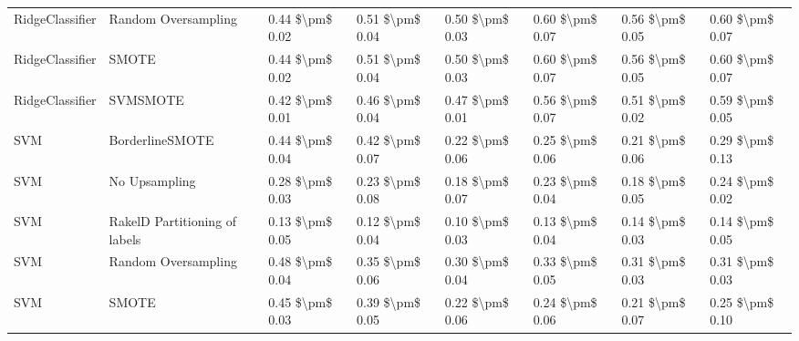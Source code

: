 \begin{tabular}{llllllll}
                RidgeClassifier &           Random Oversampling & 0.44 \$\textbackslash pm\$ 0.02 &           0.51 \$\textbackslash pm\$ 0.04 &       0.50 \$\textbackslash pm\$ 0.03 &        0.60 \$\textbackslash pm\$ 0.07 &                         0.56 \$\textbackslash pm\$ 0.05 &     0.60 \$\textbackslash pm\$ 0.07 \\
                RidgeClassifier &                         SMOTE & 0.44 \$\textbackslash pm\$ 0.02 &           0.51 \$\textbackslash pm\$ 0.04 &       0.50 \$\textbackslash pm\$ 0.03 &        0.60 \$\textbackslash pm\$ 0.07 &                         0.56 \$\textbackslash pm\$ 0.05 &     0.60 \$\textbackslash pm\$ 0.07 \\
                RidgeClassifier &                      SVMSMOTE & 0.42 \$\textbackslash pm\$ 0.01 &           0.46 \$\textbackslash pm\$ 0.04 &       0.47 \$\textbackslash pm\$ 0.01 &        0.56 \$\textbackslash pm\$ 0.07 &                         0.51 \$\textbackslash pm\$ 0.02 &     0.59 \$\textbackslash pm\$ 0.05 \\
                            SVM &               BorderlineSMOTE & 0.44 \$\textbackslash pm\$ 0.04 &           0.42 \$\textbackslash pm\$ 0.07 &       0.22 \$\textbackslash pm\$ 0.06 &        0.25 \$\textbackslash pm\$ 0.06 &                         0.21 \$\textbackslash pm\$ 0.06 &     0.29 \$\textbackslash pm\$ 0.13 \\
                            SVM &                 No Upsampling & 0.28 \$\textbackslash pm\$ 0.03 &           0.23 \$\textbackslash pm\$ 0.08 &       0.18 \$\textbackslash pm\$ 0.07 &        0.23 \$\textbackslash pm\$ 0.04 &                         0.18 \$\textbackslash pm\$ 0.05 &     0.24 \$\textbackslash pm\$ 0.02 \\
                            SVM & RakelD Partitioning of labels & 0.13 \$\textbackslash pm\$ 0.05 &           0.12 \$\textbackslash pm\$ 0.04 &       0.10 \$\textbackslash pm\$ 0.03 &        0.13 \$\textbackslash pm\$ 0.04 &                         0.14 \$\textbackslash pm\$ 0.03 &     0.14 \$\textbackslash pm\$ 0.05 \\
                            SVM &           Random Oversampling & 0.48 \$\textbackslash pm\$ 0.04 &           0.35 \$\textbackslash pm\$ 0.06 &       0.30 \$\textbackslash pm\$ 0.04 &        0.33 \$\textbackslash pm\$ 0.05 &                         0.31 \$\textbackslash pm\$ 0.03 &     0.31 \$\textbackslash pm\$ 0.03 \\
                            SVM &                         SMOTE & 0.45 \$\textbackslash pm\$ 0.03 &           0.39 \$\textbackslash pm\$ 0.05 &       0.22 \$\textbackslash pm\$ 0.06 &        0.24 \$\textbackslash pm\$ 0.06 &                         0.21 \$\textbackslash pm\$ 0.07 &     0.25 \$\textbackslash pm\$ 0.10 \\

\end{tabular}
